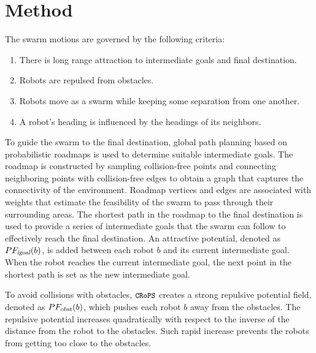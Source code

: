 \documentclass{llncs}
\newcommand{\Acronym}[1]{\ensuremath{{\small{\texttt{#1}}}}}
\newcommand{\Var}[1]{\ensuremath{{\small{\textsl{#1}}}}}
\newcommand{\Name}{\Acronym{CRoPS}}
\begin{document}
 



\section{Method}
\label{sec:Method}

%

The swarm motions are governed by the following criteria:
\begin{enumerate}
\item There is long range attraction to intermediate goals and final destination. 
\item Robots are repulsed from obstacles.
\item Robots move as a swarm while keeping some separation from one another.
\item A robot's heading is influenced by the headings of its neighbors.
\end{enumerate}
To guide the swarm to the final destination, global path planning
based on probabilistic roadmaps is used to determine suitable
intermediate goals. The roadmap is constructed by sampling
collision-free points and connecting neighboring points with
collision-free edges to obtain a graph that captures the connectivity
of the environment. Roadmap vertices and edges are associated with
weights that estimate the feasibility of the swarm to pass through
their surrounding areas. The shortest path in the roadmap to the final
destination is used to provide a series of intermediate goals that the
swarm can follow to effectively reach the final destination. An
attractive potential, denoted as $PF_\Var{igoal}(b)$, is added between
each robot $b$ and its current intermediate goal. When the robot reaches the
current intermediate goal, the next point in the shortest path is set
as the new intermediate goal.

To avoid collisions with obstacles, $\Name$ creates a strong repulsive potential
field, denoted as $PF_\Var{obst}(b)$, which
pushes each robot $b$ away from the obstacles. The repulsive potential
increases quadratically with respect to the inverse of the distance
from the robot to the obstacles. Such rapid increase prevents the robots
from getting too close to the obstacles. 
\end{document}
